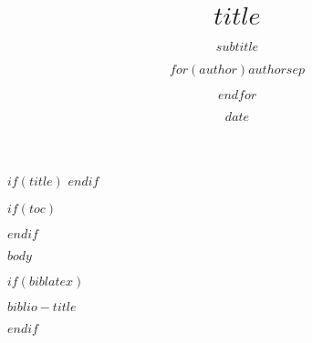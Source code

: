 \documentclass[$if(fontsize)$$fontsize$,$endif$$if(handout)$handout,$endif$$for(classoption)$$classoption$$sep$,$endfor$ ignorenonframetext]{beamer}
\title{$title$}
\subtitle{$subtitle$}
\author{$for(author)$$author$$sep$ \and $endfor$}
\institute{$for(institute)$$institute$$sep$ \and $endfor$}
\date{$date$}
\begin{document}
$if(title)$
\frame{\titlepage}
$endif$

$if(toc)$
\begin{frame}
\tableofcontents[hideallsubsections]
\end{frame}
$endif$


$body$


$if(biblatex)$
\begin{frame}[allowframebreaks]{$biblio-title$}
\printbibliography[heading=none]
\end{frame}
$endif$
\end{document}
